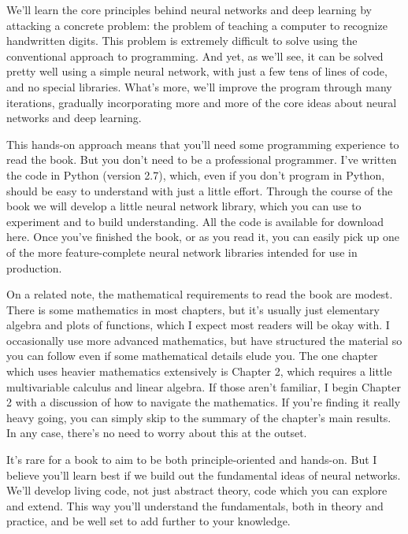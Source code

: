 

We'll learn the core principles behind neural networks and deep learning by attacking a concrete problem: the problem of teaching a computer to recognize handwritten digits. This problem is extremely difficult to solve using the conventional approach to programming. And yet, as we'll see, it can be solved pretty well using a simple neural network, with just a few tens of lines of code, and no special libraries. What's more, we'll improve the program through many iterations, gradually incorporating more and more of the core ideas about neural networks and deep learning.


This hands-on approach means that you'll need some programming experience to read the book. But you don't need to be a professional programmer. I've written the code in Python (version 2.7), which, even if you don't program in Python, should be easy to understand with just a little effort. Through the course of the book we will develop a little neural network library, which you can use to experiment and to build understanding. All the code is available for download here. Once you've finished the book, or as you read it, you can easily pick up one of the more feature-complete neural network libraries intended for use in production.


On a related note, the mathematical requirements to read the book are modest. There is some mathematics in most chapters, but it's usually just elementary algebra and plots of functions, which I expect most readers will be okay with. I occasionally use more advanced mathematics, but have structured the material so you can follow even if some mathematical details elude you. The one chapter which uses heavier mathematics extensively is Chapter 2, which requires a little multivariable calculus and linear algebra. If those aren't familiar, I begin Chapter 2 with a discussion of how to navigate the mathematics. If you're finding it really heavy going, you can simply skip to the summary of the chapter's main results. In any case, there's no need to worry about this at the outset.


It's rare for a book to aim to be both principle-oriented and hands-on. But I believe you'll learn best if we build out the fundamental ideas of neural networks. We'll develop living code, not just abstract theory, code which you can explore and extend. This way you'll understand the fundamentals, both in theory and practice, and be well set to add further to your knowledge.
